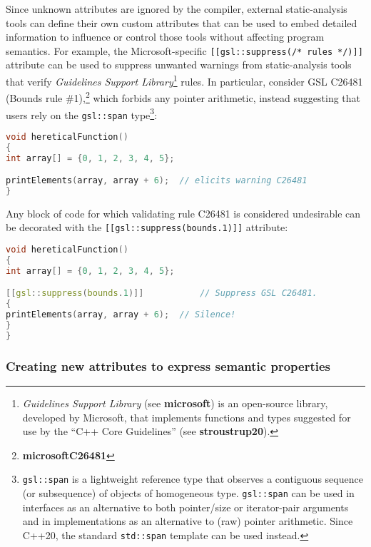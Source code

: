 Since unknown attributes are ignored by the compiler, external
static-analysis tools can define their own custom attributes that can be
used to embed detailed information to influence or control those tools
without affecting program semantics. For example, the Microsoft-specific
\texttt{[[gsl::suppress(/*}~\texttt{rules}~\texttt{*/)]]} attribute can
be used to suppress unwanted warnings from static-analysis tools that
verify \emph{Guidelines Support Library}{\cprotect\footnote{\emph{Guidelines
Support Library} (see \textbf{microsoft}) is an open-source library, developed by Microsoft,
that implements functions and types suggested for use by the ``C++
Core Guidelines'' (see \textbf{{stroustrup20}}).}}
rules. In particular, consider GSL C26481 (Bounds rule \#1),\footnote{\textbf{microsoftC26481}} which forbids any pointer arithmetic, instead
suggesting that users rely on the \texttt{gsl::span}
type{\cprotect\footnote{\texttt{gsl::span} is a lightweight reference
type that observes a contiguous sequence (or subsequence) of objects
of homogeneous type. \texttt{gsl::span} can be used in interfaces as
an alternative to both pointer/size or iterator-pair arguments and in
implementations as an alternative to (raw) pointer arithmetic. Since
C++20, the standard \texttt{std::span} template can be used instead.}}:

\begin{lstlisting}[language=C++]
void hereticalFunction()
{
int array[] = {0, 1, 2, 3, 4, 5};

printElements(array, array + 6);  // elicits warning C26481
}
\end{lstlisting}

\noindent Any block of code for which validating rule C26481 is considered
undesirable can be decorated with the
\texttt{[[gsl::suppress(bounds.1)]]} attribute:

\begin{lstlisting}[language=C++]
void hereticalFunction()
{
int array[] = {0, 1, 2, 3, 4, 5};

[[gsl::suppress(bounds.1)]]           // Suppress GSL C26481.
{
printElements(array, array + 6);  // Silence!
}
}
\end{lstlisting}


\subsubsection[Creating new attributes to express semantic properties]{Creating new attributes to express semantic properties}\label{creating-new-attributes-to-express-semantic-properties}

